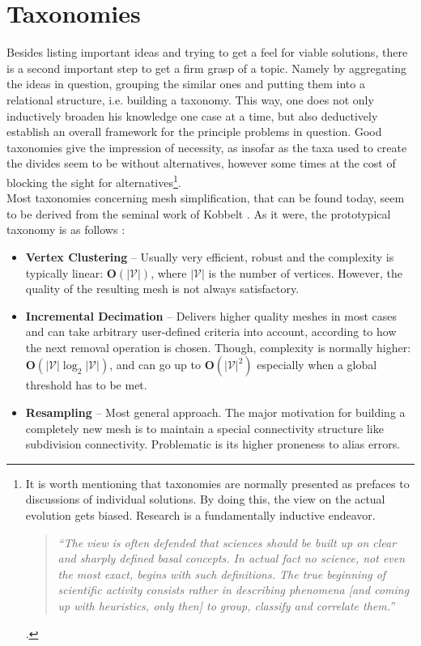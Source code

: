 \newpage	
\section{Taxonomies}
\label{simplification3}

Besides listing important ideas and trying to get a feel for viable solutions, there is a second important step to get a firm grasp of a topic.
Namely by aggregating the ideas in question, grouping the similar ones and putting them into a relational structure, i.e. building a taxonomy.
This way, one does not only inductively broaden his knowledge one case at a time, but also deductively establish an overall framework for the principle problems in question.
Good taxonomies give the impression of necessity, as insofar as the taxa used to create the divides seem to be without alternatives, however some times at the cost of blocking the sight for alternatives\footnote{ It is worth mentioning that taxonomies are normally presented as prefaces to discussions of individual solutions. By doing this, the view on the actual evolution gets biased. Research is a fundamentally inductive endeavor. \begin{quote} \textit{``The view is often defended that sciences should be built up on clear and sharply defined basal concepts. In actual fact no science, not even the most exact, begins with such definitions. The true beginning of scientific activity consists rather in describing phenomena [and coming up with heuristics, only then] to group, classify and correlate them.''} \citep[cf.][]{Freud1963} \end{quote}.}.\\
Most taxonomies concerning mesh simplification, that can be found today, seem to be derived from the seminal work of Kobbelt \citep[][cf. p.6]{Gotsman2002}.
As it were, the prototypical taxonomy is as follows \citep[][cf. p.11]{Shene2005}:
\begin{itemize}
  \setlength{\itemsep}{0cm}%
  \setlength{\parskip}{0cm}%
    \item \textbf{Vertex Clustering} -- Usually very efficient, robust and the complexity is typically linear: $\mathbf{O}(|\mathcal{V}|)$, where $|\mathcal{V}|$ is the number of vertices. However, the quality of the resulting mesh is not always satisfactory.\\
    \item \textbf{Incremental Decimation} -- Delivers higher quality meshes in most cases and can take arbitrary user-defined criteria into account, according to how the next removal operation is chosen. Though, complexity is normally higher: $\mathbf{O}(|\mathcal{V}| \log_{2} |\mathcal{V}|)$, and can go up to $\mathbf{O}(|\mathcal{V}|^{2})$ especially when a global threshold has to be met.\\
    \item \textbf{Resampling} -- Most general approach. The major motivation for building a completely new mesh is to maintain a special connectivity structure like subdivision connectivity. Problematic is its higher proneness to alias errors.\\
\end{itemize}
